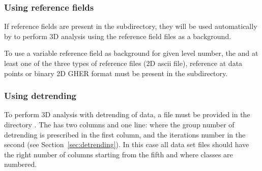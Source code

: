 \begin{center}
\end{center}


\subsubsection{Using reference fields\label{divarefeuse}}


If reference fields are present in the  subdirectory, they will be used automatically by \diva to perform  3D analysis using the reference field files as a background.

To use a variable reference field as background for given level number, the  and at least one of the three types of reference files  (2D ascii file), reference at data points or  binary 2D GHER format must be present in the  subdirectory.

\begin{center}
\end{center}



\subsubsection{Using detrending}


To perform \diva 3D analysis with detrending of data, a  file must be provided in the directory . The   has two columns and one line: where the group number of detrending is prescribed in the first column, and the iterations number in the second (see Section~\ref{sec:detrending}). In this case all data set files should have the right number of columns starting from the fifth and where classes are numbered.


